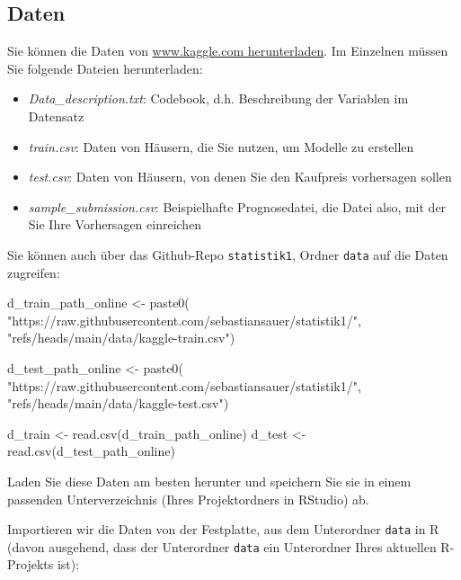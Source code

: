 \documentclass[
  letterpaper,
  oneside,
  open=any]{scrbook}
\newenvironment{Shaded}{\begin{snugshade}}{\end{snugshade}}
\newcommand{\FunctionTok}[1]{\textcolor[rgb]{0.28,0.35,0.67}{#1}}
\newcommand{\NormalTok}[1]{\textcolor[rgb]{0.00,0.23,0.31}{#1}}
\newcommand{\OtherTok}[1]{\textcolor[rgb]{0.00,0.23,0.31}{#1}}
\newcommand{\StringTok}[1]{\textcolor[rgb]{0.13,0.47,0.30}{#1}}
\providecommand{\tightlist}{%
  \setlength{\itemsep}{0pt}\setlength{\parskip}{0pt}}\usepackage{longtable,booktabs,array}
\theoremstyle{definition}
\theoremstyle{definition}
\theoremstyle{definition}
\theoremstyle{remark}
\begin{document}
\subsection{Daten}\label{daten-1}

Sie können die Daten von
\href{https://www.kaggle.com/competitions/house-prices-advanced-regression-techniques/data}{www.kaggle.com
herunterladen}. Im Einzelnen müssen Sie folgende Dateien herunterladen:

\begin{itemize}
\tightlist
\item
  \emph{Data\_description.txt}: Codebook, d.h. Beschreibung der
  Variablen im Datensatz
\item
  \emph{train.csv}: Daten von Häusern, die Sie nutzen, um Modelle zu
  erstellen
\item
  \emph{test.csv}: Daten von Häusern, von denen Sie den Kaufpreis
  vorhersagen sollen
\item
  \emph{sample\_submission.csv}: Beispielhafte Prognosedatei, die Datei
  also, mit der Sie Ihre Vorhersagen einreichen
\end{itemize}

Sie können auch über das Github-Repo \texttt{statistik1}, Ordner
\texttt{data} auf die Daten zugreifen:

\begin{Shaded}
\begin{Highlighting}[]
\NormalTok{d\_train\_path\_online }\OtherTok{\textless{}{-}} \FunctionTok{paste0}\NormalTok{(}
    \StringTok{"https://raw.githubusercontent.com/sebastiansauer/statistik1/"}\NormalTok{,}
    \StringTok{"refs/heads/main/data/kaggle{-}train.csv"}\NormalTok{)}

\NormalTok{d\_test\_path\_online }\OtherTok{\textless{}{-}} \FunctionTok{paste0}\NormalTok{(}
\StringTok{"https://raw.githubusercontent.com/sebastiansauer/statistik1/"}\NormalTok{,}
    \StringTok{"refs/heads/main/data/kaggle{-}test.csv"}\NormalTok{)}

\NormalTok{d\_train }\OtherTok{\textless{}{-}} \FunctionTok{read.csv}\NormalTok{(d\_train\_path\_online)}
\NormalTok{d\_test }\OtherTok{\textless{}{-}} \FunctionTok{read.csv}\NormalTok{(d\_test\_path\_online)}
\end{Highlighting}
\end{Shaded}

Laden Sie diese Daten am besten herunter und speichern Sie sie in einem
passenden Unterverzeichnis (Ihres Projektordners in RStudio) ab.

Importieren wir die Daten von der Festplatte, aus dem Unterordner
\texttt{data} in R (davon ausgehend, dass der Unterordner \texttt{data}
ein Unterordner Ihres aktuellen R-Projekts ist):
\end{document}
